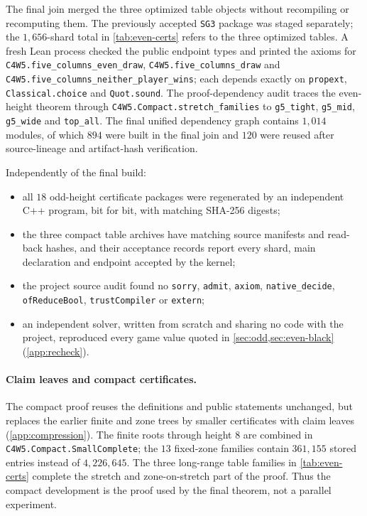 \documentclass[11pt,a4paper]{article}
\theoremstyle{plain}
\theoremstyle{definition}
\newcommand{\code}[1]{{\upshape\texttt{\small\nolinkurl{#1}}}}
\begin{document}
The final join merged the three optimized table objects without recompiling or recomputing them. The previously accepted \code{SG3} package was staged separately; the $1{,}656$-shard total in \cref{tab:even-certs} refers to the three optimized tables. A fresh Lean process checked the public endpoint types and printed the axioms for \code{C4W5.five_columns_even_draw}, \code{C4W5.five_columns_draw} and \code{C4W5.five_columns_neither_player_wins}; each depends exactly on \code{propext}, \code{Classical.choice} and \code{Quot.sound}. The proof-dependency audit traces the even-height theorem through \code{C4W5.Compact.stretch_families} to \code{g5_tight}, \code{g5_mid}, \code{g5_wide} and \code{top_all}. The final unified dependency graph contains $1{,}014$ modules, of which $894$ were built in the final join and $120$ were reused after source-lineage and artifact-hash verification.

Independently of the final build:
\begin{itemize}
  \item all $18$ odd-height certificate packages were regenerated by an independent C++ program, bit for bit, with matching SHA-256 digests;
  \item the three compact table archives have matching source manifests and read-back hashes, and their acceptance records report every shard, main declaration and endpoint accepted by the kernel;
  \item the project source audit found no \code{sorry}, \code{admit}, \code{axiom}, \code{native_decide}, \code{ofReduceBool}, \code{trustCompiler} or \code{extern};
  \item an independent solver, written from scratch and sharing no code with the project, reproduced every game value quoted in \cref{sec:odd,sec:even-black} (\cref{app:recheck}).
\end{itemize}

\paragraph{Claim leaves and compact certificates.} The compact proof reuses the definitions and public statements unchanged, but replaces the earlier finite and zone trees by smaller certificates with claim leaves (\cref{app:compression}). The finite roots through height $8$ are combined in \code{C4W5.Compact.SmallComplete}; the $13$ fixed-zone families contain $361{,}155$ stored entries instead of $4{,}226{,}645$. The three long-range table families in \cref{tab:even-certs} complete the stretch and zone-on-stretch part of the proof. Thus the compact development is the proof used by the final theorem, not a parallel experiment.
\end{document}
